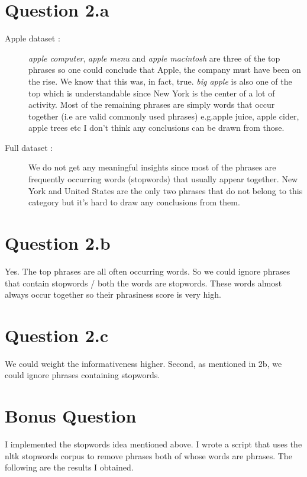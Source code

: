 \documentclass[paper=a4, fontsize=11pt]{scrartcl} %
\numberwithin{equation}{section} %
\numberwithin{figure}{section} %
\numberwithin{table}{section} %
\begin{document}
\section*{\textbf{Question 2.a}}
\begin{description}
\item[Apple dataset :] \textit{apple computer}, \textit{apple menu} and \textit{apple macintosh} are three of the top phrases so one could conclude that Apple, the company must have been on the rise. We know that this was, in fact, true. \textit{big apple} is also one of the top which is understandable since New York is the center of a lot of activity. Most of the remaining phrases are simply words that occur together (i.e are valid commonly used phrases) e.g.apple juice, apple cider, apple trees etc I don't think any conclusions can be drawn from those.
\item[Full dataset :] We do not get any meaningful insights since most of the phrases are frequently occurring words (stopwords) that usually appear together. New York and United States are the only two phrases that do not belong to this category but it's hard to draw any conclusions from them.
\end{description}

\section*{\textbf{Question 2.b}}
Yes. The top phrases are all often occurring words. So we could ignore phrases that contain stopwords / both the words are stopwords. These words almost always occur together so their phrasiness score is very high.

\section*{\textbf{Question 2.c}}
We could weight the informativeness higher. Second, as mentioned in 2b, we could ignore phrases containing stopwords.

\section*{\textbf{Bonus Question}}
I implemented the stopwords idea mentioned above. I wrote a script that uses the nltk stopwords corpus to remove phrases both of whose words are phrases. The following are the results I obtained.
\end{document}
